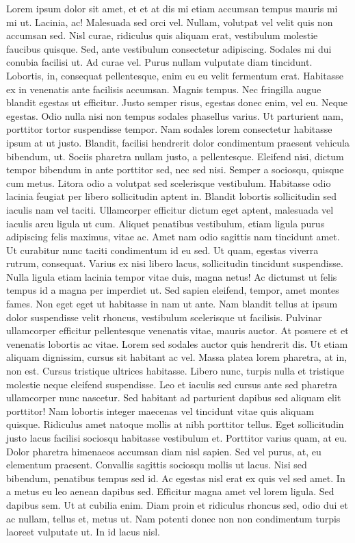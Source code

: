 \documentclass[
  12pt,
]{article}
\begin{document}
Lorem ipsum dolor sit amet, et et at dis mi etiam accumsan tempus mauris mi mi ut. Lacinia, ac! Malesuada sed orci vel. Nullam, volutpat vel velit quis non accumsan sed. Nisl curae, ridiculus quis aliquam erat, vestibulum molestie faucibus quisque. Sed, ante vestibulum consectetur adipiscing. Sodales mi dui conubia facilisi ut. Ad curae vel. Purus nullam vulputate diam tincidunt. Lobortis, in, consequat pellentesque, enim eu eu velit fermentum erat. Habitasse ex in venenatis ante facilisis accumsan. Magnis tempus. Nec fringilla augue blandit egestas ut efficitur. Justo semper risus, egestas donec enim, vel eu. Neque egestas. Odio nulla nisi non tempus sodales phasellus varius. Ut parturient nam, porttitor tortor suspendisse tempor. Nam sodales lorem consectetur habitasse ipsum at ut justo. Blandit, facilisi hendrerit dolor condimentum praesent vehicula bibendum, ut. Sociis pharetra nullam justo, a pellentesque. Eleifend nisi, dictum tempor bibendum in ante porttitor sed, nec sed nisi. Semper a sociosqu, quisque cum metus. Litora odio a volutpat sed scelerisque vestibulum. Habitasse odio lacinia feugiat per libero sollicitudin aptent in. Blandit lobortis sollicitudin sed iaculis nam vel taciti. Ullamcorper efficitur dictum eget aptent, malesuada vel iaculis arcu ligula ut cum. Aliquet penatibus vestibulum, etiam ligula purus adipiscing felis maximus, vitae ac. Amet nam odio sagittis nam tincidunt amet. Ut curabitur nunc taciti condimentum id eu sed. Ut quam, egestas viverra rutrum, consequat. Varius ex nisi libero lacus, sollicitudin tincidunt suspendisse. Nulla ligula etiam lacinia tempor vitae duis, magna netus! Ac dictumst ut felis tempus id a magna per imperdiet ut. Sed sapien eleifend, tempor, amet montes fames. Non eget eget ut habitasse in nam ut ante. Nam blandit tellus at ipsum dolor suspendisse velit rhoncus, vestibulum scelerisque ut facilisis. Pulvinar ullamcorper efficitur pellentesque venenatis vitae, mauris auctor. At posuere et et venenatis lobortis ac vitae. Lorem sed sodales auctor quis hendrerit dis. Ut etiam aliquam dignissim, cursus sit habitant ac vel. Massa platea lorem pharetra, at in, non est. Cursus tristique ultrices habitasse. Libero nunc, turpis nulla et tristique molestie neque eleifend suspendisse. Leo et iaculis sed cursus ante sed pharetra ullamcorper nunc nascetur. Sed habitant ad parturient dapibus sed aliquam elit porttitor! Nam lobortis integer maecenas vel tincidunt vitae quis aliquam quisque. Ridiculus amet natoque mollis at nibh porttitor tellus. Eget sollicitudin justo lacus facilisi sociosqu habitasse vestibulum et. Porttitor varius quam, at eu. Dolor pharetra himenaeos accumsan diam nisl sapien. Sed vel purus, at, eu elementum praesent. Convallis sagittis sociosqu mollis ut lacus. Nisi sed bibendum, penatibus tempus sed id. Ac egestas nisl erat ex quis vel sed amet. In a metus eu leo aenean dapibus sed. Efficitur magna amet vel lorem ligula. Sed dapibus sem. Ut at cubilia enim. Diam proin et ridiculus rhoncus sed, odio dui et ac nullam, tellus et, metus ut. Nam potenti donec non non condimentum turpis laoreet vulputate ut. In id lacus nisl.
\end{document}
